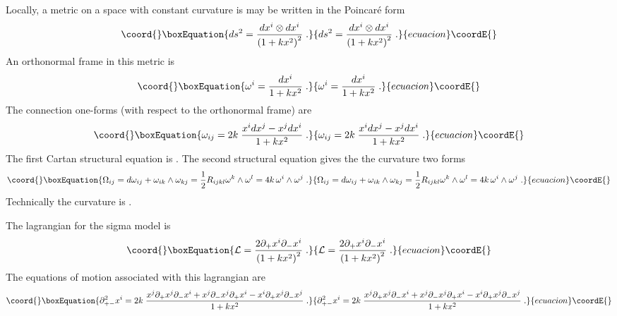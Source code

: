 \documentclass[a4paper,12pt]{article}
\providecommand{\dalem}{\partial^{2}_{+-}}
\providecommand{\dminus}{\partial_{-}}
\providecommand{\dplus}{\partial_{+}}
\providecommand{\half}{\frac{1}{2}}
\begin{document}
Locally, a metric on a space with constant curvature is may be written 
in the Poincar\'{e} form
\begin{equation}\coord{}\boxEquation{
    ds^{2} = \frac{dx^{i}\otimes dx^{i}}{\left(1 + k x^{2}\right)^{2}}\;.
    \label{eq:constcurv}
}{
    ds^{2} = \frac{dx^{i}\otimes dx^{i}}{\left(1 + k x^{2}\right)^{2}}\;.
    }{ecuacion}\coordE{}\end{equation}
An orthonormal frame in this metric is
\begin{equation}\coord{}\boxEquation{
    \omega^{i} = \frac{dx^{i}}{1 + kx^{2}}\;.
    \label{eq:frame}
}{
    \omega^{i} = \frac{dx^{i}}{1 + kx^{2}}\;.
    }{ecuacion}\coordE{}\end{equation}
The connection one-forms (with respect to the orthonormal frame) are
\begin{equation}\coord{}\boxEquation{
    \omega_{ij} = 2k\; \frac{x^{i}dx^{j}-x^{j}dx^{i}}{1+kx^{2}}\;.
    \label{eq:connection}
}{
    \omega_{ij} = 2k\; \frac{x^{i}dx^{j}-x^{j}dx^{i}}{1+kx^{2}}\;.
    }{ecuacion}\coordE{}\end{equation}
The first Cartan structural equation is \coordHE{}. The second structural equation gives the
the curvature two forms
\begin{equation}\coord{}\boxEquation{
    \Omega_{ij} = d\omega_{ij} + \omega_{ik}\wedge\omega_{kj} 
    =\half R_{ijkl}\omega^{k}\wedge\omega^{l} = 
    4k\,\omega^{i}\wedge\omega^{j}\;.
    \label{eq:curvature}
}{
    \Omega_{ij} = d\omega_{ij} + \omega_{ik}\wedge\omega_{kj} 
    =\half R_{ijkl}\omega^{k}\wedge\omega^{l} = 
    4k\,\omega^{i}\wedge\omega^{j}\;.
    }{ecuacion}\coordE{}\end{equation}
Technically the curvature is \coordHE{}.

The lagrangian for the sigma model is
\begin{equation}\coord{}\boxEquation{
    \mathcal{L} = 
    \frac{2\dplus x^{i} \dminus x^{i}}{\left(1 + k x^{2}\right)^{2}}\;.
    \label{eq:lagrangian}
}{
    \mathcal{L} = 
    \frac{2\dplus x^{i} \dminus x^{i}}{\left(1 + k x^{2}\right)^{2}}\;.
    }{ecuacion}\coordE{}\end{equation}
The equations of motion associated with this lagrangian are
\begin{equation}\coord{}\boxEquation{
    \dalem x^{i} = 2k\;
    \frac{x^{j}\dplus x^{j}\dminus x^{i}
    	+ x^{j}\dminus x^{j} \dplus x^{i}
	- x^{i}\dplus x^{j} \dminus x^{j}}{1 + kx^{2}}\;.
    \label{eq:eom}
}{
    \dalem x^{i} = 2k\;
    \frac{x^{j}\dplus x^{j}\dminus x^{i}
    	+ x^{j}\dminus x^{j} \dplus x^{i}
	- x^{i}\dplus x^{j} \dminus x^{j}}{1 + kx^{2}}\;.
    }{ecuacion}\coordE{}\end{equation}
\end{document}

